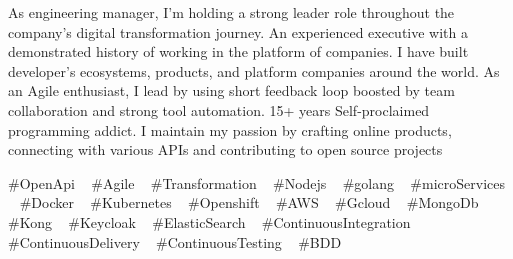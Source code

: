 

\begin{cvparagraph}


As engineering manager, I'm holding a strong leader role throughout the company's digital transformation journey.
An experienced executive with a demonstrated history of working in the platform of companies. I have built developer's ecosystems, products, and platform companies around the world.
As an Agile enthusiast, I lead by using short feedback loop boosted by team collaboration and strong tool automation.
15+ years Self-proclaimed programming addict. I maintain my passion by crafting online products, connecting with various APIs and contributing to open source projects


\end{cvparagraph}
\begin{cvtechnologies}
 \#OpenApi ~
 \#Agile ~
 \#Transformation ~
 \#Nodejs ~
 \#golang ~
 \#microServices ~
 \#Docker ~
 \#Kubernetes ~
 \#Openshift ~
 \#AWS ~
 \#Gcloud ~
 \#MongoDb ~
 \#Kong ~
 \#Keycloak ~
 \#ElasticSearch ~
 \#ContinuousIntegration ~
 \#ContinuousDelivery ~
 \#ContinuousTesting ~
 \#BDD 
\end{cvtechnologies}

